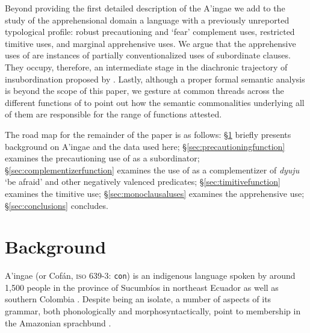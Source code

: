 \documentclass[output=paper,colorlinks,citecolor=brown]{langscibook}
\begin{document}
Beyond providing the first detailed description of the A'ingae \sane[,] we add to the study of the apprehensional domain a language with a previously unreported typological profile: robust precautioning and `fear' complement uses, restricted timitive uses, and marginal apprehensive uses. We argue that the apprehensive uses of  are instances of partially conventionalized uses of subordinate clauses. They occupy, therefore, an intermediate stage in the diachronic trajectory of insubordination proposed by \citet{evans2007insubordination}. Lastly, al\-though a proper formal semantic analysis is beyond the scope of this paper, we gesture at common threads across the different functions of  to point out how the semantic commonalities underlying all of them are responsible for the range of functions attested.

The road map for the remainder of the paper is as follows: \S\ref{sec:background} briefly presents background on A'ingae and the data used here; 
\S\ref{sec:precautioningfunction}  examines the precautioning use of  as a subordinator;
\S\ref{sec:complementizerfunction} examines the use of  as a complementizer of \emph{dyuju} `be afraid' and other negatively valenced predicates;
\S\ref{sec:timitivefunction}  examines the timitive use;
\S\ref{sec:monoclausaluses} examines the apprehensive use;
\S\ref{sec:conclusions} concludes.




\section{Background}
\label{sec:background}


A'ingae (or Cofán, {\textsc{iso} 639-3}: \texttt{con}) is an indigenous language spoken by around 1,500 people in the province of Sucumbíos in northeast Ecuador as well as southern Colombia \citep{dabkowski2021ldd}.
Despite being an isolate, a number of aspects of its grammar, both phonologically and morphosyntactically, point to membership in the Amazonian sprachbund \citep{fischerhengeveld, repetti-ludlow2019aingae,AELSS,sanker-reconstruction}.
\end{document}
